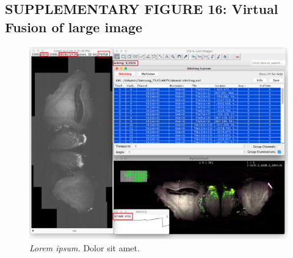 \documentclass[]{spie}  %
\begin{document}
\subsection*{SUPPLEMENTARY FIGURE 16: Virtual Fusion of large image}
\vspace{1mm}
\begin{figure}[h!]
\includegraphics[width=\textwidth]{fig-fusion-screenshot.png}
\vspace{-2.0mm}
\caption{\hspace{-0.5mm} \emph{Lorem ipsum.} Dolor sit amet.
}
\label{fig:sup-fig-fusion}
\end{figure}

\pagebreak
\end{document}
